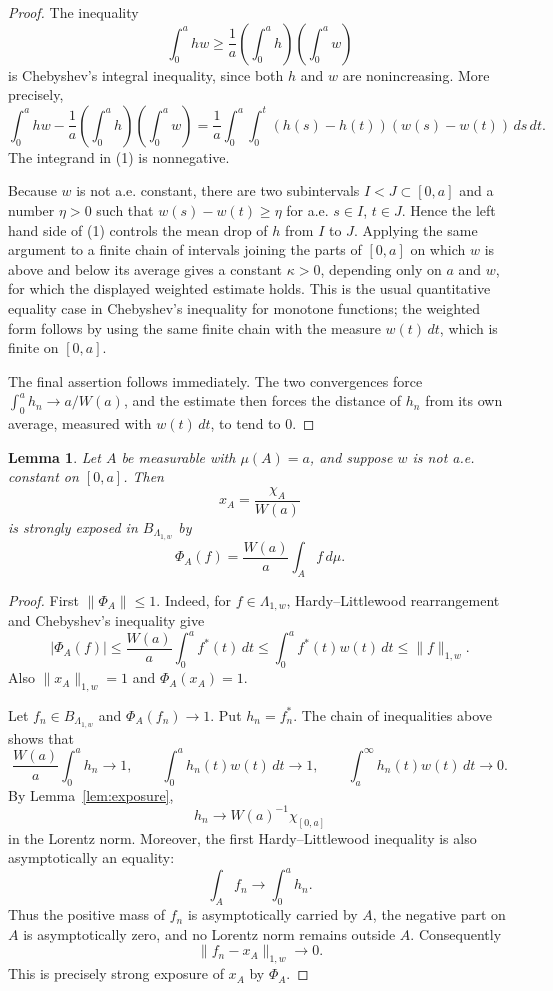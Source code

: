 \documentclass[11pt]{article}
\newtheorem{lemma}{Lemma}
\begin{document}
\begin{proof}
The inequality
\[
  \int_0^a h w
  \geq
  \frac1a\left(\int_0^a h\right)\left(\int_0^a w\right)
\]
is Chebyshev's integral inequality, since both \(h\) and \(w\) are
nonincreasing.  More precisely,
\[
  \int_0^a h w
  -\frac1a\left(\int_0^a h\right)\left(\int_0^a w\right)
  =
  \frac1a\int_0^a\int_0^t
       (h(s)-h(t))(w(s)-w(t))\,ds\,dt .        \tag{1}
\]
The integrand in (1) is nonnegative.

Because \(w\) is not a.e. constant, there are two subintervals
\(I<J\subset[0,a]\) and a number \(\eta>0\) such that
\(w(s)-w(t)\geq\eta\) for a.e. \(s\in I\), \(t\in J\).  Hence the left hand
side of (1) controls the mean drop of \(h\) from \(I\) to \(J\).  Applying the
same argument to a finite chain of intervals joining the parts of
\([0,a]\) on which \(w\) is above and below its average gives a constant
\(\kappa>0\), depending only on \(a\) and \(w\), for which the displayed
weighted estimate holds.  This is the usual quantitative equality case in
Chebyshev's inequality for monotone functions; the weighted form follows by
using the same finite chain with the measure \(w(t)\,dt\), which is finite on
\([0,a]\).

The final assertion follows immediately.  The two convergences force
\(\int_0^a h_n\to a/W(a)\), and the estimate then forces the distance of
\(h_n\) from its own average, measured with \(w(t)\,dt\), to tend to \(0\).
\end{proof}

\begin{lemma}\label{lem:strong-expose}
Let \(A\) be measurable with \(\mu(A)=a\), and suppose \(w\) is not a.e.
constant on \([0,a]\).  Then
\[
  x_A=\frac{\chi_A}{W(a)}
\]
is strongly exposed in \(B_{\Lambda_{1,w}}\) by
\[
  \Phi_A(f)=\frac{W(a)}a\int_A f\,d\mu .
\]
\end{lemma}

\begin{proof}
First \(\|\Phi_A\|\le1\).  Indeed, for \(f\in\Lambda_{1,w}\),
Hardy--Littlewood rearrangement and Chebyshev's inequality give
\[
 |\Phi_A(f)|
 \leq
 \frac{W(a)}a\int_0^a f^*(t)\,dt
 \leq
 \int_0^a f^*(t)w(t)\,dt
 \leq
 \|f\|_{1,w}.
\]
Also \(\|x_A\|_{1,w}=1\) and \(\Phi_A(x_A)=1\).

Let \(f_n\in B_{\Lambda_{1,w}}\) and \(\Phi_A(f_n)\to1\).  Put
\(h_n=f_n^*\).  The chain of inequalities above shows that
\[
 \frac{W(a)}a\int_0^a h_n\to1,\qquad
 \int_0^a h_n(t)w(t)\,dt\to1,\qquad
 \int_a^\infty h_n(t)w(t)\,dt\to0.
\]
By Lemma~\ref{lem:exposure},
\[
 h_n\longrightarrow W(a)^{-1}\chi_{[0,a]}
\]
in the Lorentz norm.  Moreover, the first Hardy--Littlewood inequality is
also asymptotically an equality:
\[
 \int_A f_n\to\int_0^a h_n.
\]
Thus the positive mass of \(f_n\) is asymptotically carried by \(A\), the
negative part on \(A\) is asymptotically zero, and no Lorentz norm remains
outside \(A\).  Consequently
\[
  \|f_n-x_A\|_{1,w}\to0.
\]
This is precisely strong exposure of \(x_A\) by \(\Phi_A\).
\end{proof}
\end{document}
